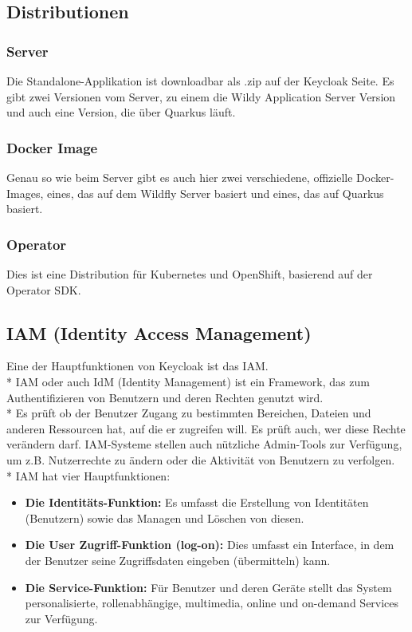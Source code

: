 \subsection{Distributionen}
\subsubsection{Server}
Die Standalone-Applikation ist downloadbar als .zip auf der Keycloak Seite. Es gibt zwei Versionen vom Server, zu einem die Wildy Application Server Version und auch eine Version, die über Quarkus läuft.
\subsubsection{Docker Image}
Genau so wie beim Server gibt es auch hier zwei verschiedene, offizielle Docker-Images, eines, das auf dem Wildfly Server basiert und eines, das auf Quarkus basiert.
\subsubsection{Operator}
Dies ist eine Distribution für Kubernetes und OpenShift, basierend auf der Operator SDK. \cite{KeyCloakDZone}
\subsection{IAM (Identity Access Management)}
\label{sec:IAM}
Eine der Hauptfunktionen von Keycloak ist das IAM. \\*
IAM oder auch IdM (Identity Management) ist ein Framework, das zum Authentifizieren von Benutzern und deren Rechten genutzt wird. \\*
Es prüft ob der Benutzer Zugang zu bestimmten Bereichen, Dateien und anderen Ressourcen hat, auf die er zugreifen will. Es prüft auch, wer diese Rechte verändern darf.
IAM-Systeme stellen auch nützliche Admin-Tools zur Verfügung, um z.B. Nutzerrechte zu ändern oder die Aktivität von Benutzern zu verfolgen. \cite{KeycloakMakeIT} \\*
IAM hat vier Hauptfunktionen:
\begin{itemize}
    \item \textbf{Die Identitäts-Funktion: }Es umfasst die Erstellung von Identitäten (Benutzern) sowie das Managen und Löschen von diesen.  
    \item \textbf{Die User Zugriff-Funktion (log-on): } Dies umfasst ein Interface, in dem der Benutzer seine Zugriffsdaten eingeben (übermitteln) kann.
    \item \textbf{Die Service-Funktion: } Für Benutzer und deren Geräte stellt das System personalisierte, rollenabhängige, multimedia, online und on-demand Services zur Verfügung. \cite{KeycloakMakeIT}
\end{itemize}

